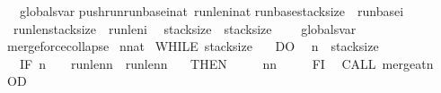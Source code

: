 \begin{isabellebody}
\ {\isacharparenleft}\ globals{\isacharunderscore}var{\isacharparenright}\isanewline
push{\isacharunderscore}run{\isacharparenleft}run{\isacharunderscore}base{\isacharunderscore}i{\isacharcolon}{\isacharcolon}nat{\isacharcomma}\ run{\isacharunderscore}len{\isacharunderscore}i{\isacharcolon}{\isacharcolon}nat{\isacharparenright}\isanewline
{\isachardoublequoteopen}{\isasymacute}run{\isacharunderscore}base{\isacharbang}{\isasymacute}stack{\isacharunderscore}size\ {\isacharcolon}{\isacharequal}{\isacharequal}\ {\isasymacute}run{\isacharunderscore}base{\isacharunderscore}i\ {\isacharsemicolon}{\isacharsemicolon}\isanewline
\ {\isasymacute}run{\isacharunderscore}len{\isacharbang}{\isasymacute}stack{\isacharunderscore}size\ {\isacharcolon}{\isacharequal}{\isacharequal}\ {\isasymacute}run{\isacharunderscore}len{\isacharunderscore}i\ {\isacharsemicolon}{\isacharsemicolon}\isanewline
\ {\isasymacute}stack{\isacharunderscore}size\ {\isacharcolon}{\isacharequal}{\isacharequal}\ {\isasymacute}stack{\isacharunderscore}size\ {\isacharplus}\ {}{\isachardoublequoteclose}\isanewline
\isanewline
{}\isamarkupfalse%
\ {\isacharparenleft}\ globals{\isacharunderscore}var{\isacharparenright}\isanewline
merge{\isacharunderscore}force{\isacharunderscore}collapse{\isacharparenleft}{\isacharparenright}\isanewline
{}\ n{\isacharcolon}{\isacharcolon}nat\ \isanewline
{\isachardoublequoteopen}WHILE\ {\isasymacute}stack{\isacharunderscore}size\ {\isachargreater}\ {}\ \isanewline
DO\isanewline
\ \ {\isasymacute}n\ {\isacharcolon}{\isacharequal}{\isacharequal}\ {\isasymacute}stack{\isacharunderscore}size\ {\isacharminus}\ {}{\isacharsemicolon}{\isacharsemicolon}\isanewline
\ \ IF\ {\isacharparenleft}{\isasymacute}n\ {\isachargreater}\ {}\ {\isasymand}\ {\isasymacute}run{\isacharunderscore}len{\isacharbang}{\isacharparenleft}{\isasymacute}n{\isacharminus}{}{\isacharparenright}\ {\isacharless}\ {\isasymacute}run{\isacharunderscore}len{\isacharbang}{\isacharparenleft}{\isasymacute}n{\isacharplus}{}{\isacharparenright}{\isacharparenright}\ \isanewline
\ \ THEN\ \isanewline
\ \ \ \ {\isasymacute}n{\isacharcolon}{\isacharequal}{\isacharequal}{\isasymacute}n\ {\isacharminus}\ {}\ \isanewline
\ \ FI{\isacharsemicolon}{\isacharsemicolon}\isanewline
\ \ CALL\ merge{\isacharunderscore}at{\isacharparenleft}{\isasymacute}n{\isacharparenright}\ \isanewline
OD{\isachardoublequoteclose}\isanewline
\isanewline
\isanewline
{}\isamarkupfalse%

\end{isabellebody}
